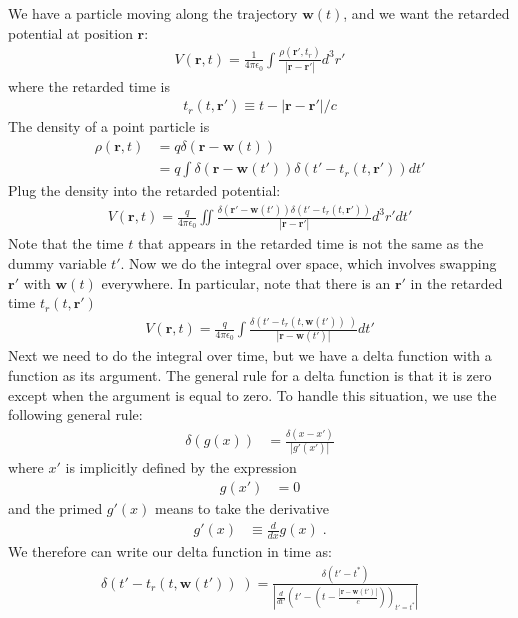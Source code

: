 \documentclass[12pt]{article}
\renewcommand{\vec}[1]{\boldsymbol{#1}}
\begin{document}
We have a particle moving along the trajectory $\vec{w}(t)$, and we want the retarded potential at position $\vec{r}$:
\begin{align}
V(\vec{r}, t) = \frac{1}{4\pi\epsilon_0}\int \frac{\rho(\vec{r}', t_r)}{|\vec{r} - \vec{r}'|} d^3r'
\end{align}
where the retarded time is
\begin{align}
t_r(t, \vec{r}') \equiv t - |\vec{r}-\vec{r}'|/c
\end{align}
The density of a point particle is
\begin{align}
\rho(\vec{r}, t) &= q \delta(\vec{r} - \vec{w}(t)) \\
& = q \int  \delta(\vec{r} - \vec{w}(t')) \delta(t' - t_r(t, \vec{r}'))  dt'
\end{align}
Plug the density into the retarded potential:
\begin{align}
V(\vec{r}, t) = \frac{q}{4\pi\epsilon_0}\iint \frac{  \delta(\vec{r}' - \vec{w}(t')) \delta(t' - t_r(t, \vec{r}'))  }{|\vec{r} - \vec{r}'|} d^3r' dt'
\end{align}
Note that the time $t$ that appears in the retarded time is not the same as the dummy variable $t'$.  Now we do the integral over space, which involves swapping $\vec{r}'$ with $\vec{w}(t)$ everywhere.  In particular, note that there is an 
$\vec{r}'$ in the retarded time $t_r(t, \vec{r}')$
\begin{align}\label{eqn:tint}
V(\vec{r}, t) = \frac{q}{4\pi\epsilon_0}\int \frac{ \delta(t' - t_r(t, \vec{w}(t') )\;)  }{|\vec{r} - \vec{w}(t')|} dt'
\end{align}
Next we need to do the integral over time, but we have a delta function with a function as its argument.  The general rule for a delta function is that it is zero except when the argument is equal to zero.  To handle this situation, we use the 
following general rule:
\begin{align}
\delta(g(x)) &= \frac{\delta(x-x')}{|g'(x')|} 
\end{align}
where $x'$ is implicitly defined by the expression
\begin{align}
g(x') & = 0
\end{align}
and the primed $g'(x)$ means to take the derivative
\begin{align}
g'(x) &\equiv \frac{d }{dx}g(x)  \;.
\end{align}
We therefore can write our delta function in time as:
\begin{align}
\delta(t' - t_r(t, \vec{w}(t') )\;) = \frac{\delta(t' - t^*)}{\left |  \frac{d}{dt'} \left(  t' - \left(t - \frac{|\vec{r} - \vec{w}(t')|}{c}\right) \right)_{t' = t^*} \right |}
\end{align}
\end{document}
